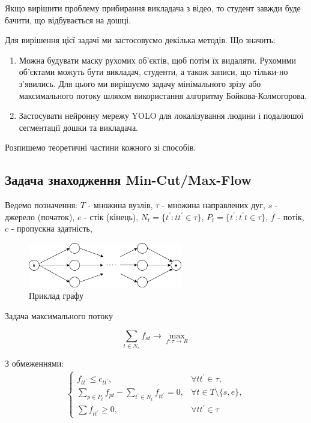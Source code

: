 Якщо вирішити проблему прибирання викладача з відео, то студент завжди 
буде бачити, що відбувається на дошці.

Для вирішення цієї задачі ми застосовуємо декілька методів.
Що значить:
\begin{enumerate}
    \item Можна будувати маску рухомих об'єктів,
          щоб потім їх видаляти. Рухомими об'єктами можуть бути викладач, 
          студенти, а також записи, що тільки-но з'явились.
          Для цього ми вирішуємо задачу мінімального зрізу або максимального потоку
          шляхом використання алгоритму Бойкова-Колмогорова.
    \item Застосувати нейронну мережу YOLO для локалізування людини
          і подалюшої сегментації дошки та викладача.
\end{enumerate}

Розпишемо теоретичні частини кожного зі способів.

\subsection{Задача знаходження Min-Cut/Max-Flow}

Ведемо позначення:
$T$ - множина вузлів, 
$\tau$ - множина направлених дуг,
$s$ - джерело (початок),
$e$ - стік (кінець),
$N_t = \{t^{'}: tt^{'} \in \tau \}$,
$P_t = \{t^{'}: t^{'}t \in \tau \}$,
$f$ - потік,
$c$ - пропускна здатність,

\begin{figure}[h]
    \centering
    \includegraphics[width=0.6\textwidth]{images/graph_example}
    \caption{Приклад графу}
    \label{fig:graph_example}
\end{figure}

Задача максимального потоку

\begin{equation}
    \sum_{t \in N_s} f_{st} \rightarrow \max_{f: \tau \rightarrow R }
\end{equation}

З обмеженнями: 
\begin{equation} 
    \begin{gathered}
        \begin{cases}
            f_{tt^{'}} \leq  c_{tt^{'}}, &  \forall tt^{'}  \in \tau , \\

            \sum_{p \in P_t} f_{pt} - \sum_{t^{'} \in N_t} f_{tt^{'}} = 0, & 
            \forall t \in T \setminus \{s,e\}, \\

            \sum f_{tt^{'}} \geq 0, & \forall tt^{'}  \in \tau
        \end{cases}
\end{gathered}
\end{equation}

